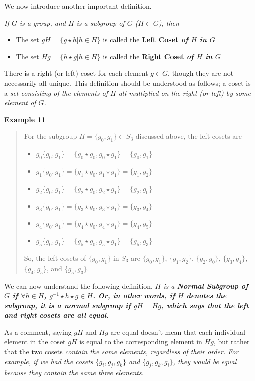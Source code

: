 \documentclass[12pt,epsf]{article}
\begin{document}
We now introduce another important definition.

\it If $G$ is a group,
and $H$ is a subgroup of $G$ ($H\subset G$), then
\begin{itemize}
\parskip 0pt
\item The set $gH = \{g\star h |h\in H\}$ is called the \bf Left
Coset \it of $H$ in $G$ \\
\item The set $Hg = \{h\star g |h\in H\}$ is called the \bf Right
Coset \it of $H$ in $G$
\end{itemize}

\rm There is a right (or left) coset for each element $g \in G$, though
they are not necessarily all unique.  This definition should be
understood as follows; a coset is a \it set \rm consisting of the
elements of $H$ all multiplied on the right (or left) by some element
of $G$.  

\bf Example 11 \rm
\vspace*{-2ex}
\begin{quote}
For the subgroup $H = \{g_0,g_1\} \subset S_3$
discussed above, the left cosets are
\begin{itemize}
\parskip 0pt
\item[] $g_0\{g_0,g_1\} = \{g_0 \star g_0, g_0 \star g_1\} =
\{g_0,g_1\}$
\item[] $g_1\{g_0,g_1\} = \{g_1 \star g_0, g_1 \star g_1\} =
\{g_1,g_2\} $
\item[] $g_2\{g_0,g_1\} = \{g_2 \star g_0, g_2 \star g_1\} =
\{g_2,g_0\} $
\item[] $g_3\{g_0,g_1\} = \{g_3 \star g_0, g_3 \star g_1\} =
\{g_3,g_4\} $
\item[] $g_4\{g_0,g_1\} = \{g_4 \star g_0, g_4 \star g_1\} =
\{g_4,g_5\} $
\item[] $g_5\{g_0,g_1\} = \{g_5 \star g_0, g_5 \star g_1\} =
\{g_5,g_3\}$
\end{itemize}
So, the left cosets of $\{g_0,g_1\}$ in $S_3$ are $\{g_0,g_1\}$,
$\{g_1,g_2\}$, $\{g_2,g_0\}$, $\{g_3,g_4\}$, $\{g_4,g_5\}$, and
$\{g_5,g_3\}$.
\end{quote}

We can now understand the following definition.  \it $H$ is a \bf
Normal Subgroup \rm of $G$ if $\forall h \in H$, $g^{-1} \star h \star
g \in H$.  Or, in other words, if $H$ denotes the subgroup, it is a
normal subgroup if $gH = Hg$, which says that the left and right
cosets are all equal.	\rm 

As a comment, saying $gH$ and $Hg$ are equal doesn't mean that each
individual element in the coset $gH$ is equal to the corresponding
element in $Hg$, but rather that the two cosets \it contain \rm the
same elements, regardless of their order.  For example, if we had the
cosets $\{g_i, g_j, g_k\}$ and $\{g_j, g_k, g_i\}$, they would be equal
because they contain the same three elements.  
\end{document}
